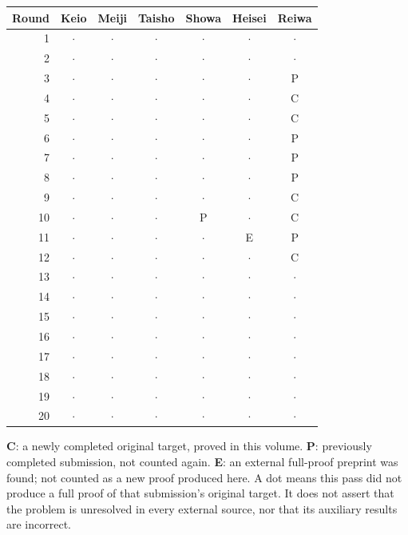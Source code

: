 \documentclass[11pt,a4paper]{article}
\theoremstyle{remark}\newtheorem{remark}[theorem]{Remark}
\numberwithin{equation}{section}
\begin{document}
\begin{center}
\begin{tabular}{@{}rcccccc@{}}\toprule
Round & Keio & Meiji & Taisho & Showa & Heisei & Reiwa\\\midrule
1 & $\cdot$ & $\cdot$ & $\cdot$ & $\cdot$ & $\cdot$ & $\cdot$\\
2 & $\cdot$ & $\cdot$ & $\cdot$ & $\cdot$ & $\cdot$ & $\cdot$\\
3 & $\cdot$ & $\cdot$ & $\cdot$ & $\cdot$ & $\cdot$ & P\\
4 & $\cdot$ & $\cdot$ & $\cdot$ & $\cdot$ & $\cdot$ & C\\
5 & $\cdot$ & $\cdot$ & $\cdot$ & $\cdot$ & $\cdot$ & C\\
6 & $\cdot$ & $\cdot$ & $\cdot$ & $\cdot$ & $\cdot$ & P\\
7 & $\cdot$ & $\cdot$ & $\cdot$ & $\cdot$ & $\cdot$ & P\\
8 & $\cdot$ & $\cdot$ & $\cdot$ & $\cdot$ & $\cdot$ & P\\
9 & $\cdot$ & $\cdot$ & $\cdot$ & $\cdot$ & $\cdot$ & C\\
10 & $\cdot$ & $\cdot$ & $\cdot$ & P & $\cdot$ & C\\
11 & $\cdot$ & $\cdot$ & $\cdot$ & $\cdot$ & E & P\\
12 & $\cdot$ & $\cdot$ & $\cdot$ & $\cdot$ & $\cdot$ & C\\
13 & $\cdot$ & $\cdot$ & $\cdot$ & $\cdot$ & $\cdot$ & $\cdot$\\
14 & $\cdot$ & $\cdot$ & $\cdot$ & $\cdot$ & $\cdot$ & $\cdot$\\
15 & $\cdot$ & $\cdot$ & $\cdot$ & $\cdot$ & $\cdot$ & $\cdot$\\
16 & $\cdot$ & $\cdot$ & $\cdot$ & $\cdot$ & $\cdot$ & $\cdot$\\
17 & $\cdot$ & $\cdot$ & $\cdot$ & $\cdot$ & $\cdot$ & $\cdot$\\
18 & $\cdot$ & $\cdot$ & $\cdot$ & $\cdot$ & $\cdot$ & $\cdot$\\
19 & $\cdot$ & $\cdot$ & $\cdot$ & $\cdot$ & $\cdot$ & $\cdot$\\
20 & $\cdot$ & $\cdot$ & $\cdot$ & $\cdot$ & $\cdot$ & $\cdot$\\
\bottomrule\end{tabular}
\end{center}
\noindent
\textbf{C}: a newly completed original target, proved in this volume.
\textbf{P}: previously completed submission, not counted again.
\textbf{E}: an external full-proof preprint was found; not counted as a
new proof produced here.
A dot means this pass did not produce a full proof of that submission's
original target. It does not assert that the problem is unresolved in every
external source, nor that its auxiliary results are incorrect.
\end{document}
